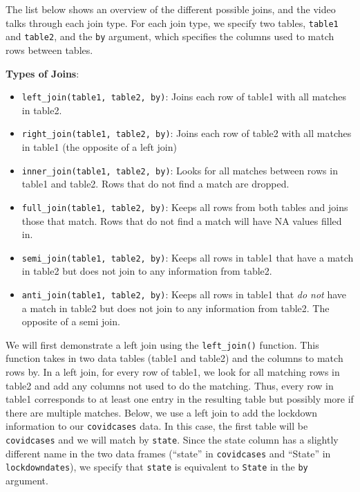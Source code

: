 \documentclass[
  letterpaper,
]{krantz}
\providecommand{\tightlist}{%
  \setlength{\itemsep}{0pt}\setlength{\parskip}{0pt}}\usepackage{longtable,booktabs,array}
\begin{document}
The list below shows an overview of the different possible joins, and
the video talks through each join type. For each join type, we specify
two tables, \texttt{table1} and \texttt{table2}, and the \texttt{by}
argument, which specifies the columns used to match rows between tables.

\textbf{Types of Joins}:

\begin{itemize}
\tightlist
\item
  \texttt{left\_join(table1,\ table2,\ by)}: Joins each row of table1
  with all matches in table2.\\
\item
  \texttt{right\_join(table1,\ table2,\ by)}: Joins each row of table2
  with all matches in table1 (the opposite of a left join)\\
\item
  \texttt{inner\_join(table1,\ table2,\ by)}: Looks for all matches
  between rows in table1 and table2. Rows that do not find a match are
  dropped.\\
\item
  \texttt{full\_join(table1,\ table2,\ by)}: Keeps all rows from both
  tables and joins those that match. Rows that do not find a match will
  have NA values filled in.\\
\item
  \texttt{semi\_join(table1,\ table2,\ by)}: Keeps all rows in table1
  that have a match in table2 but does not join to any information from
  table2.\\
\item
  \texttt{anti\_join(table1,\ table2,\ by)}: Keeps all rows in table1
  that \emph{do not} have a match in table2 but does not join to any
  information from table2. The opposite of a semi join.
\end{itemize}

We will first demonstrate a left join using the \texttt{left\_join()}
function. This function takes in two data tables (table1 and table2) and
the columns to match rows by. In a left join, for every row of table1,
we look for all matching rows in table2 and add any columns not used to
do the matching. Thus, every row in table1 corresponds to at least one
entry in the resulting table but possibly more if there are multiple
matches. Below, we use a left join to add the lockdown information to
our \texttt{covidcases} data. In this case, the first table will be
\texttt{covidcases} and we will match by \texttt{state}. Since the state
column has a slightly different name in the two data frames (``state''
in \texttt{covidcases} and ``State'' in \texttt{lockdowndates}), we
specify that \texttt{state} is equivalent to \texttt{State} in the
\texttt{by} argument.
\end{document}
